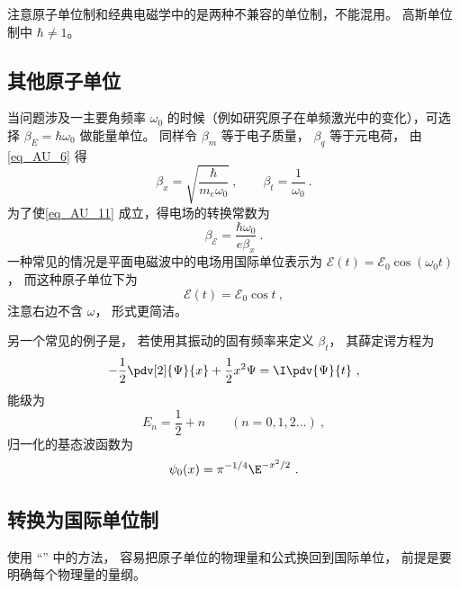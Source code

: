 注意原子单位制和经典电磁学中的是两种不兼容的单位制，不能混用。 高斯单位制中 $\hbar\ne 1$。

\subsection{其他原子单位}

当问题涉及一主要角频率 $\omega_0$ 的时候（例如研究原子在单频激光中的变化），可选择 $\beta_E = \hbar\omega_0$ 做能量单位。 同样令 $\beta_m$ 等于电子质量， $\beta_q$ 等于元电荷， 由\autoref{eq_AU_6} 得
\begin{equation}\label{eq_AU_15}
\beta_x = \sqrt{\frac{\hbar}{m_e\omega_0}}~,
\qquad
\beta_t = \frac{1}{\omega_0}~.
\end{equation}
为了使\autoref{eq_AU_11} 成立，得电场的转换常数为
\begin{equation}
\beta_\mathcal{E} = \frac{\hbar\omega_0}{e \beta_x}~.
\end{equation}
一种常见的情况是平面电磁波中的电场用国际单位表示为 $\mathcal{E}(t) = \mathcal{E}_0\cos(\omega_0 t)$， 而这种原子单位下为
\begin{equation}
\mathcal{E}(t) = \mathcal{E}_0\cos t~,
\end{equation}
注意右边不含 $\omega$， 形式更简洁。

另一个常见的例子是， 若使用其振动的固有频率来定义 $\beta_t$， 其薛定谔方程为
\begin{equation}\label{eq_AU_18}
-\frac12 \pdv[2]{\Psi}{x} + \frac12 x^2 \Psi= \I\pdv{\Psi}{t}~,
\end{equation}
能级为
\begin{equation}\label{eq_AU_19}
E_n = \frac12 + n \qquad (n = 0, 1, 2\dots)~,
\end{equation}
归一化的基态波函数为
\begin{equation}
\psi_0(x) = \pi^{-1/4} \E^{-x^2/2}~.
\end{equation}


\subsection{转换为国际单位制}
使用 “” 中的方法， 容易把原子单位的物理量和公式换回到国际单位， 前提是要明确每个物理量的量纲。

